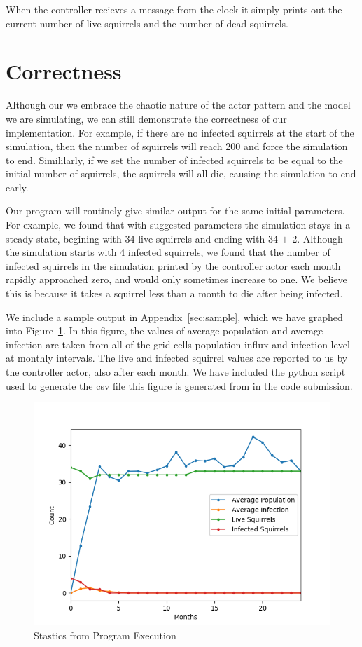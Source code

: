 \documentclass[oneside]{article}
\begin{document}
When the controller recieves a message from the clock it simply prints out the current number of live squirrels and the number of dead squirrels.

\section{Correctness}\label{sec:cor}
Although our we embrace the chaotic nature of the actor pattern and the model we are simulating, we can still demonstrate the correctness of our implementation. For example, if there are no infected squirrels at the start of the simulation, then the number of squirrels will reach 200 and force the simulation to end. Simililarly, if we set the number of infected squirrels to be equal to the initial number of squirrels, the squirrels will all die, causing the simulation to end early.

Our program will routinely give similar output for the same initial parameters. For example, we found that with suggested parameters the simulation stays in a steady state, begining with 34 live squirrels and ending with 34 $\pm$ 2. Although the simulation starts with 4 infected squirrels, we found that the number of infected squirrels in the simulation printed by the controller actor each month rapidly approached zero, and would only sometimes increase to one. We believe this is because it takes a squirrel less than a month to die after being infected.

We include a sample output in Appendix~\ref{sec:sample}, which we have graphed into Figure~\ref{fig:prog-ex}. In this figure, the values of average population and average infection are taken from all of the grid cells population influx and infection level at monthly intervals. The live and infected squirrel values are reported to us by the controller actor, also after each month. We have included the python script used to generate the csv file this figure is generated from in the code submission.
\begin{figure}
  \includegraphics[width=\linewidth]{figures/d1}
  \caption{Stastics from Program Execution}
  \label{fig:prog-ex}
\end{figure}
\end{document}
